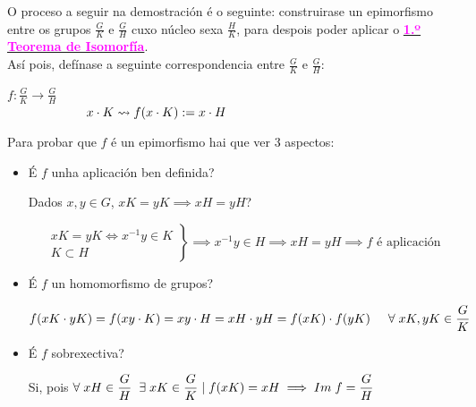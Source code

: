 \documentclass[twoside]{report}
\newcommand{\magbf}[1]{\textcolor{magenta}{\textbf{#1}}} %
\theoremstyle{mystyle}
\begin{document}
\noindent O proceso a seguir na demostración é o seguinte: construirase un epimorfismo entre os grupos $\displaystyle \frac{G}{K}$ e $\displaystyle \frac{G}{H}$ cuxo núcleo sexa $\displaystyle \frac{H}{K}$, para despois poder aplicar o \hyperref[th1.5]{\magbf{1.º Teorema de Isomorfía}}.\\

\noindent Así pois, defínase a seguinte correspondencia entre $\displaystyle \frac{G}{K}$ e $\displaystyle \frac{G}{H}$: 

    \begin{center}
            $f: \displaystyle \frac{G}{K} \longrightarrow \displaystyle \frac{G}{H}$ \\
        \vspace{2mm}
        $\hspace{22mm} x \cdot K \leadsto f(x \cdot K) := x \cdot H$
    \end{center} 
    
\noindent Para probar que $f$ é un epimorfismo hai que ver 3 aspectos: 

\begin{itemize}
    
    \item É $f$ unha aplicación ben definida?
    
    Dados $x,y \in G$, $xK = yK \implies xH = yH$?
    
    \[ 
    \left. \begin{array}{r} 
    xK = yK \Longleftrightarrow x^{-1}y \in K \\[1ex]
    K \subset H
    \end{array} \right\} 
    \implies x^{-1}y \in H \implies xH = yH \implies f \text{ é aplicación}
    \]
    
    \item É $f$ un homomorfismo de grupos?
    
    \begin{center}
        $f(xK \cdot yK) = f(xy \cdot K) = xy \cdot H = xH \cdot yH = f(xK) \cdot f(yK) \hspace{5mm} \forall \hspace{1mm} xK, yK \in \displaystyle \frac{G}{K}$
    \end{center}
    
    \item É $f$ sobrexectiva?
    
    Si, pois \hspace{2mm} $\forall \hspace{1mm} xH \in \displaystyle \frac{G}{H} \hspace{2mm} \exists \hspace{1mm} xK \in \displaystyle \frac{G}{K} \hspace{1mm} | \hspace{1mm} f(xK) = xH \implies Im \hspace{1mm} f = \frac{G}{H}$
    
\end{itemize}
\end{document}
